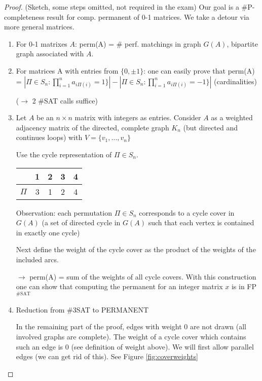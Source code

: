 \documentclass[11pt]{article}
\theoremstyle{definition}
\theoremstyle{definition}
\begin{document}
\begin{proof} (Sketch, some steps omitted, not required in the exam)
Our goal is a \#P-completeness result for comp. permanent of 0-1 matrices. We take a detour via more general matrices.

\begin{enumerate}
\item For 0-1 matrixes $ A $: perm(A) = \# perf. matchings in graph $ G(A) $, bipartite graph associated with $ A $.

\item For matrices A with entries from $ \{ 0, \pm 1\} $: one can easily prove that perm(A) = $ |\Pi \in S_n: \prod \limits_{i=1}^n a_{i\Pi(i)} = 1\}| - |\Pi \in S_n: \prod \limits_{i=1}^n a_{i\Pi(i)} = -1\}| $ (cardinalities)

($ \rightarrow $ 2 \#SAT calls suffice)

\item Let $ A $ be an $ n \times n $ matrix with integers as entries. Consider $ A $ as a weighted adjacency matrix of the directed, complete graph $ K_n $ (but directed and continues loops) with $ V = \{ v_1, \dots , v_n \} $

Use the cycle representation of $ \Pi \in S_n $.


\begin{tabular}{c | c c c c}
& 1 & 2 & 3 & 4 \\
\hline
$ \Pi $ & 3 & 1 & 2 & 4 \\
\end{tabular}

Observation: each permutation $ \Pi \in S_n $ corresponds to a cycle cover in $ G(A) $ (a set of directed cycle in $ G(A) $ such that each vertex is contained in exactly one cycle)

Next define the weight of the cycle cover as the product of the weights of the included arcs.

$ \rightarrow $ perm(A) = sum of the weights of all cycle covers. With this construction one can show that computing the permanent for an integer matrix $ x $ is in FP$^{\text{\#SAT}}$

\item

Reduction from \#3SAT to PERMANENT

In the remaining part of the proof, edges with weight 0 are not drawn (all involved graphs are complete). The weight of a cycle cover which contains such an edge is 0 (see definition of weight above). We will first allow parallel edges (we can get rid of this). See Figure \ref{fig:coverweights}


\end{enumerate}
\end{proof}
\end{document}
